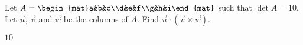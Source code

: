 
\begin{Exercise}[
name={},
title={}, 
difficulty=0,
origin={\cite{MH}}]
Let $A=\begin{mat}a&b&c\\d&e&f\\g&h&i\end{mat}$ such that $\det A=10$. Let $\vec u$, $\vec v$ and $\vec w$ be the columns of $A$. Find $\vec u\cdot(\vec v\times\vec w)$.
\end{Exercise}

\begin{Answer}
$10$
\end{Answer}
